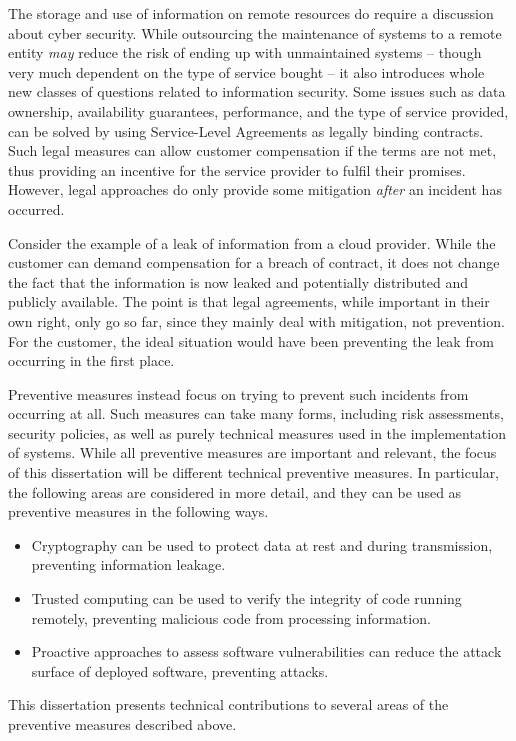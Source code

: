 The storage and use of information on remote resources do require a discussion about cyber security.
While outsourcing the maintenance of systems to a remote entity \emph{may} reduce the risk of ending up with unmaintained systems -- though very much dependent on the type of service bought -- it also introduces whole new classes of questions related to information security.
Some issues such as data ownership, availability guarantees, performance, and the type of service provided, can be solved by using Service-Level Agreements as legally binding contracts.
Such legal measures can allow customer compensation if the terms are not met, thus providing an incentive for the service provider to fulfil their promises.
However, legal approaches do only provide some mitigation \emph{after} an incident has occurred.

Consider the example of a leak of information from a cloud provider.
While the customer can demand compensation for a breach of contract, it does not change the fact that the information is now leaked and potentially distributed and publicly available.
The point is that legal agreements, while important in their own right, only go so far, since they mainly deal with mitigation, not prevention.
For the customer, the ideal situation would have been preventing the leak from occurring in the first place.

Preventive measures instead focus on trying to prevent such incidents from occurring at all.
Such measures can take many forms, including risk assessments, security policies, as well as purely technical measures used in the implementation of systems.
While all preventive measures are important and relevant, the focus of this dissertation will be different technical preventive measures.
In particular, the following areas are considered in more detail, and they can be used as preventive measures in the following ways.
\begin{itemize}
	\item Cryptography can be used to protect data at rest and during transmission, preventing information leakage.
	\item Trusted computing can be used to verify the integrity of code running remotely, preventing malicious code from processing information.
	\item Proactive approaches to assess software vulnerabilities can reduce the attack surface of deployed software, preventing attacks.
\end{itemize}

This dissertation presents technical contributions to several areas of the preventive measures described above.

